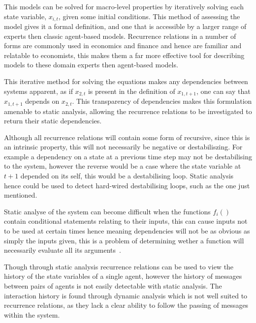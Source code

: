 \documentclass{article}
\begin{document}
This models can be solved for macro-level properties by iteratively solving each state variable, $x_{i, t}$, given some initial conditions. This method of assessing the model gives it a formal definition, and one that is accessible by a larger range of experts then classic agent-based models. Recurrence relations in a number of forms are commonly used in economics and finance and hence are familiar and relatable to economists, this makes them a far more effective tool for describing models to these domain experts then agent-based models.

This iterative method for solving the equations makes any dependencies between systems apparent, as if $x_{2, t}$ is present in the definition of $x_{1, t+1}$, one can say that $x_{1,t+1}$ depends on $x_{2,t}$. This transparency of dependencies makes this formulation amenable to static analysis, allowing the recurrence relations to be investigated to return their static dependencies.

Although all recurrence relations will contain some form of recursive, since this is an intrinsic property, this will not necessarily be negative or destabiliszing. For example a dependency on a state at a previous time step may not be destabilising to the system, however the reverse would be a case where the state variable at $t+1$ depended on its self, this would be a destabilising loop. Static analysis hence could be used to detect hard-wired destabilising loops, such as the one just mentioned.

Static analyse of the system can become difficult when the functions $f_{i}()$ contain conditional statements relating to their inputs, this can cause inputs not to be used at certain times hence meaning dependencies will not be as obvious as simply the inputs given, this is a problem of determining wether a function will necessarily evaluate all its arguments~\cite{willevaluteargsa}.

Though through static analysis recurrence relations can be used to view the history of the state variables of a single agent, however the history of messages between pairs of agents is not easily detectable with static analysis. The interaction history is found through dynamic analysis which is not well suited to recurrence relations, as they lack a clear ability to follow the passing of messages within the system.   








\end{document}
